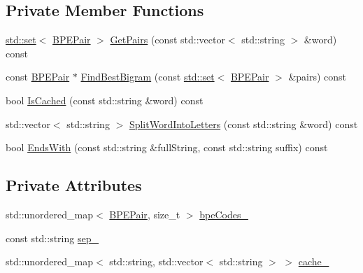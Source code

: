 \subsection*{Private Member Functions}
\begin{DoxyCompactItemize}
\item 
\hyperlink{marian_2src_2tests_2CMakeLists_8txt_a59d4487ba23386d5b73310f034357598}{std\+::set}$<$ \hyperlink{classamunmt_1_1BPE_a3c38d7a027b9574c2b0baf3cd17f8e9c}{B\+P\+E\+Pair} $>$ \hyperlink{classamunmt_1_1BPE_a98b27329dd9a9146202d2bd732ce4ba3}{Get\+Pairs} (const std\+::vector$<$ std\+::string $>$ \&word) const 
\item 
const \hyperlink{classamunmt_1_1BPE_a3c38d7a027b9574c2b0baf3cd17f8e9c}{B\+P\+E\+Pair} $\ast$ \hyperlink{classamunmt_1_1BPE_ab1ad9af2c5806b7e2ee2bf91bd38d80b}{Find\+Best\+Bigram} (const \hyperlink{marian_2src_2tests_2CMakeLists_8txt_a59d4487ba23386d5b73310f034357598}{std\+::set}$<$ \hyperlink{classamunmt_1_1BPE_a3c38d7a027b9574c2b0baf3cd17f8e9c}{B\+P\+E\+Pair} $>$ \&pairs) const 
\item 
bool \hyperlink{classamunmt_1_1BPE_a7840a80bf09596f2b3415070f3324b4b}{Is\+Cached} (const std\+::string \&word) const 
\item 
std\+::vector$<$ std\+::string $>$ \hyperlink{classamunmt_1_1BPE_a6089b76990dd5e462f8bcc7249fcb912}{Split\+Word\+Into\+Letters} (const std\+::string \&word) const 
\item 
bool \hyperlink{classamunmt_1_1BPE_a21b9fe0b9cd1782985a5917bed7eb5f2}{Ends\+With} (const std\+::string \&full\+String, const std\+::string suffix) const 
\end{DoxyCompactItemize}
\subsection*{Private Attributes}
\begin{DoxyCompactItemize}
\item 
std\+::unordered\+\_\+map$<$ \hyperlink{classamunmt_1_1BPE_a3c38d7a027b9574c2b0baf3cd17f8e9c}{B\+P\+E\+Pair}, size\+\_\+t $>$ \hyperlink{classamunmt_1_1BPE_a4f76078a35e375984a320271f4f40fa5}{bpe\+Codes\+\_\+}
\item 
const std\+::string \hyperlink{classamunmt_1_1BPE_a172a55b6b2190b1b8ad206ee4cf81c45}{sep\+\_\+}
\item 
std\+::unordered\+\_\+map$<$ std\+::string, std\+::vector$<$ std\+::string $>$ $>$ \hyperlink{classamunmt_1_1BPE_a13eb53ebc158d710ac9ce969ce6b3b71}{cache\+\_\+}
\end{DoxyCompactItemize}


